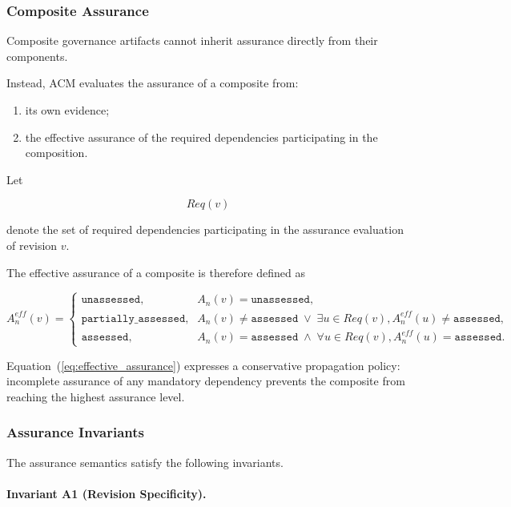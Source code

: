 \documentclass[10pt]{article}
\begin{document}
\subsubsection{Composite Assurance}

Composite governance artifacts cannot inherit assurance directly from their
components.

Instead, ACM evaluates the assurance of a composite from:

\begin{enumerate}
	\item its own evidence;
	\item the effective assurance of the required dependencies participating in
	the composition.
\end{enumerate}

Let

\[
Req(v)
\]

denote the set of required dependencies participating in the assurance
evaluation of revision \(v\).

The effective assurance of a composite is therefore defined as

\begin{equation}
	A_n^{eff}(v)
	=
	\begin{cases}
		\texttt{unassessed},
		&
		A_n(v)=\texttt{unassessed},
		\\[0.4em]
		\texttt{partially\_assessed},
		&
		A_n(v)\neq\texttt{assessed}
		\;\vee\;
		\exists u\in Req(v),
		A_n^{eff}(u)\neq\texttt{assessed},
		\\[0.4em]
		\texttt{assessed},
		&
		A_n(v)=\texttt{assessed}
		\;\land\;
		\forall u\in Req(v),
		A_n^{eff}(u)=\texttt{assessed}.
	\end{cases}
	\label{eq:effective_assurance}
\end{equation}

Equation~(\ref{eq:effective_assurance}) expresses a conservative propagation
policy: incomplete assurance of any mandatory dependency prevents the composite
from reaching the highest assurance level.

\subsubsection{Assurance Invariants}

The assurance semantics satisfy the following invariants.

\paragraph{Invariant A1 (Revision Specificity).}
\end{document}
